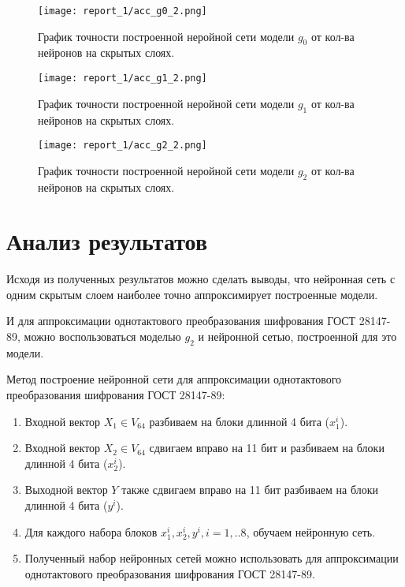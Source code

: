 \documentclass[a4paper,12pt,twoside]{article}
\begin{document}
	\begin{figure}[h!]
	\texttt{[image: report\_1/acc\_g0\_2.png]}
	
	График точности построенной неройной сети модели $g_0$ от кол-ва нейронов на скрытых слоях.
	
	\texttt{[image: report\_1/acc\_g1\_2.png]}
	
	График точности построенной неройной сети модели $g_1$ от кол-ва нейронов на скрытых слоях.
	\end{figure}
	
	\begin{figure}[htb!]
	\texttt{[image: report\_1/acc\_g2\_2.png]}
	
	График точности построенной неройной сети модели $g_2$ от кол-ва нейронов на скрытых слоях.
	\end{figure}

	\section{Анализ результатов}
	\bigskip
	Исходя из полученных результатов можно сделать выводы, что нейронная сеть с одним скрытым слоем наиболее точно аппроксимирует построенные модели.
	
	\bigskip
	
	\noindent  И для аппроксимации однотактового преобразования шифрования ГОСТ 28147-89, можно воспользоваться моделью $g_2$ и нейронной сетью, построенной для это модели.
	
	\bigskip
	
	\noindent  Метод построение нейронной сети для аппроксимации однотактового преобразования шифрования ГОСТ 28147-89:
	\begin{enumerate}
	\item Входной вектор $X_1 \in V_{64}$ разбиваем на блоки длинной 4 бита ($x_1^{i}$).
	
	\item Входной вектор $X_2 \in V_{64}$ сдвигаем вправо на 11 бит и разбиваем на блоки длинной 4 бита ($x_2^{i}$).
	
	\item Выходной вектор $Y$ также сдвигаем вправо на 11 бит разбиваем на блоки длинной 4 бита ($y^{i}$).
	
	\item Для каждого набора блоков $x_1^{i}, x_2^{i}, y^{i}, i=1,..8$, обучаем нейронную сеть.
	
	\item Полученный набор нейронных сетей можно использовать для аппроксимации однотактового преобразования шифрования ГОСТ 28147-89.
	
	\end{enumerate}
	\bigskip
	
\end{document}
